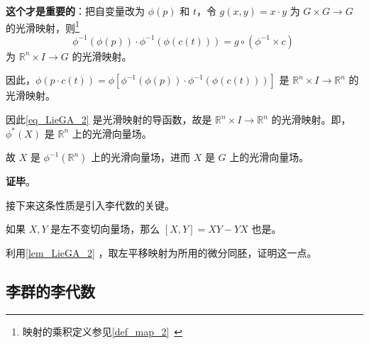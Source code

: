 \textbf{这个才是重要的}：把自变量改为 $\phi(p)$ 和 $t$，令 $g(x, y)=x\cdot y$ 为 $G\times G\to G$ 的光滑映射，则\footnote{映射的乘积定义参见\autoref{def_map_2}~}
\begin{equation}
\phi^{-1}(\phi(p))\cdot \phi^{-1}(\phi(c(t)))=g\circ(\phi^{-1}\times c)~
\end{equation}
为 $\mathbb{R}^n\times I\to G$ 的光滑映射。

因此，$\phi(p\cdot c(t))=\phi[\phi^{-1}(\phi(p))\cdot \phi^{-1}(\phi(c(t)))]$ 是 $\mathbb{R}^n\times I\to \mathbb{R}^n$ 的光滑映射。

因此\autoref{eq_LieGA_2} 是光滑映射的导函数，故是 $\mathbb{R}^n\times I\to \mathbb{R}^n$ 的光滑映射。即，$\phi^*(X)$ 是 $\mathbb{R}^n$ 上的光滑向量场。

故 $X$ 是 $\phi^{-1}(\mathbb{R}^n)$ 上的光滑向量场，进而 $X$ 是 $G$ 上的光滑向量场。









\textbf{证毕}。

接下来这条性质是引入李代数的关键。

\begin{exercise}{}
如果 $X, Y$ 是左不变切向量场，那么 $[X, Y]=XY-YX$ 也是。

利用\autoref{lem_LieGA_2} ，取左平移映射为所用的微分同胚，证明这一点。
\end{exercise}


\subsection{李群的李代数}

